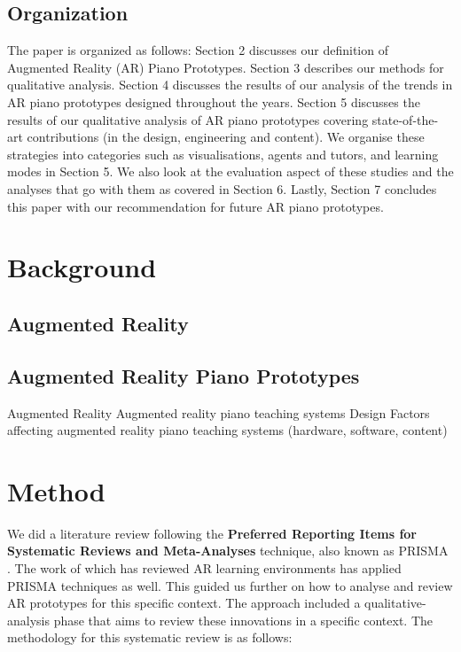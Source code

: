 \documentclass[manuscript,screen]{acmart}
\begin{document}
\subsection{Organization}
The paper is organized as follows: Section 2 discusses our definition of Augmented Reality (AR) Piano Prototypes. Section 3 describes our methods for qualitative analysis. Section 4 discusses the results of our analysis of the trends in AR piano prototypes designed throughout the years. Section 5 discusses the results of our qualitative analysis of AR piano prototypes covering state-of-the-art contributions (in the design, engineering and content). We organise these strategies into categories such as visualisations, agents and tutors, and learning modes in Section 5. We also look at the evaluation aspect of these studies and the analyses that go with them as covered in Section 6. Lastly, Section 7 concludes this paper with our recommendation for future AR piano prototypes. 





\section{Background}
\subsection{Augmented Reality}
\subsection{Augmented Reality Piano Prototypes}
Augmented Reality
Augmented reality piano teaching systems
Design Factors affecting augmented reality piano teaching systems (hardware, software, content)

\section{Method}

We did a literature review following the \textbf{Preferred Reporting Items for Systematic Reviews and Meta-Analyses} technique, also known as PRISMA \cite{moher2009preferred}. The work of \citet{santos2013augmented} which has reviewed AR learning environments has applied PRISMA techniques as well. This guided us further on how to analyse and review AR prototypes for this specific context. The approach included a  qualitative-analysis phase that aims to review these innovations in a specific context. The methodology for this systematic review is as follows: 
\end{document}
